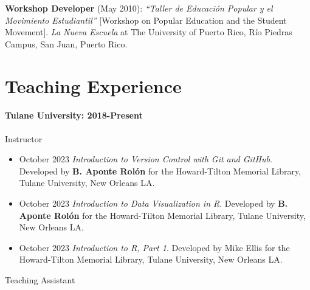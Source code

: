 \documentclass[11pt,a4paper,]{awesome-cv}
\begin{document}
\textbf{Workshop Developer} (May 2010): \emph{``Taller de Educación
Popular y el Movimiento Estudiantil''} {[}Workshop on Popular Education
and the Student Movement{]}. \emph{La Nueva Escuela} at The University
of Puerto Rico, Río Piedras Campus, San Juan, Puerto Rico.

\section{\texorpdfstring{ Teaching
Experience}{ Teaching Experience}}\label{teaching-experience}

\paragraph{\texorpdfstring{Tulane University: 2018-Present\\
}{Tulane University: 2018-Present }}\label{tulane-university-2018-present}

Instructor

\begin{itemize}
\item
  October 2023 \textbar{} \emph{Introduction to Version Control with Git
  and GitHub}. Developed by \textbf{B. Aponte Rolón} for the
  Howard-Tilton Memorial Library, Tulane University, New Orleans LA.
\item
  October 2023 \textbar{} \emph{Introduction to Data Visualization in
  R}. Developed by \textbf{B. Aponte Rolón} for the Howard-Tilton
  Memorial Library, Tulane University, New Orleans LA.
\item
  October 2023 \textbar{} \emph{Introduction to R, Part 1}. Developed by
  Mike Ellis for the Howard-Tilton Memorial Library, Tulane University,
  New Orleans LA.
\end{itemize}

Teaching Assistant
\end{document}
